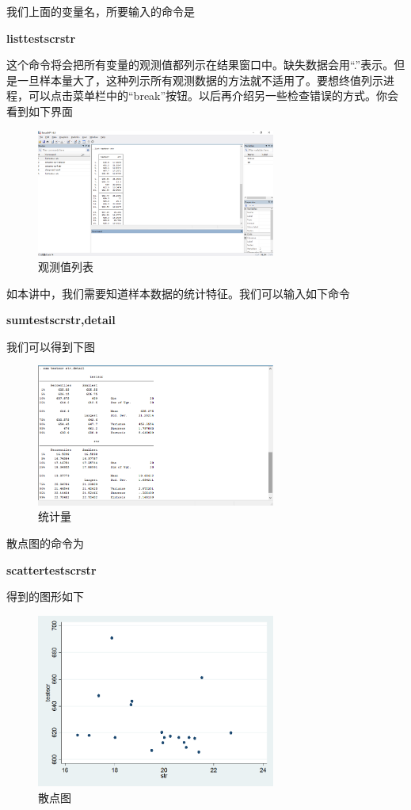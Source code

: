 \documentclass[cn,12pt,math=newtx,citestyle=gb7714-2015,bibstyle=gb7714-2015]{elegantbook}
\begin{document}
	我们上面的变量名，所要输入的命令是
	
	\textbf{list\quad testscr\quad str}
	
	这个命令将会把所有变量的观测值都列示在结果窗口中。缺失数据会用“.”表示。但是一旦样本量大了，这种列示所有观测数据的方法就不适用了。要想终值列示进程，可以点击菜单栏中的“break”按钮。以后再介绍另一些检查错误的方式。你会看到如下界面
	\begin{figure}[htbp]
		\centering
		\includegraphics[width=0.7\textwidth]{list.png}
		\caption{观测值列表}\label{fig:digit}
	\end{figure}
	
	如本讲中，我们需要知道样本数据的统计特征。我们可以输入如下命令
	
	\textbf{sum\quad testscr\quad str,detail}
	
	我们可以得到下图
	\begin{figure}[htbp]
		\centering
		\includegraphics[width=0.7\textwidth]{sum.png}
		\caption{统计量}\label{fig:digit}
	\end{figure}
	
	散点图的命令为
	
	\textbf{scatter\quad testscr\quad str}
	
	得到的图形如下
	\begin{figure}[htbp]
		\centering
		\includegraphics[width=0.7\textwidth]{Graph.png}
		\caption{散点图}\label{fig:digit}
	\end{figure}
	
\end{document}
